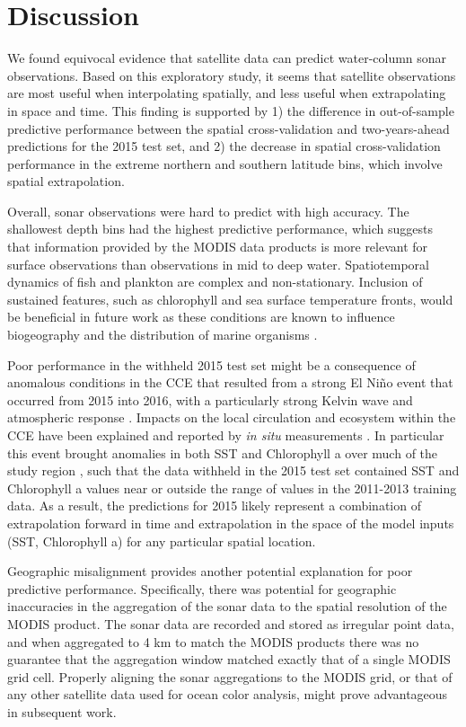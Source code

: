 \documentclass[10pt,letterpaper]{article}
\begin{document}
\section*{Discussion}

We found equivocal evidence that satellite data can predict water-column sonar observations.
Based on this exploratory study, it seems that satellite observations are most useful when interpolating spatially, and less useful when extrapolating in space and time.
This finding is supported by 1) the difference in out-of-sample predictive performance between the spatial cross-validation and two-years-ahead predictions for the 2015 test set, and 2) the decrease in spatial cross-validation performance in the extreme northern and southern latitude bins, which involve spatial extrapolation.

Overall, sonar observations were hard to predict with high accuracy.
The shallowest depth bins had the highest predictive performance, which suggests that information provided by the MODIS data products is more relevant for surface observations than observations in mid to deep water.
Spatiotemporal dynamics of fish and plankton are complex and non-stationary.
Inclusion of sustained features, such as chlorophyll and sea surface temperature fronts, would be beneficial in future work as these conditions are known to influence biogeography and the distribution of marine organisms \cite{taylor2012sharp, powell2015covariability}.

Poor performance in the withheld 2015 test set might be a consequence of anomalous conditions in the CCE that resulted from a strong El Ni\~no event that occurred from 2015 into 2016, with a particularly strong Kelvin wave and atmospheric response \cite{chen2017formation, hu2017extreme}.
Impacts on the local circulation and ecosystem within the CCE have been explained \cite{jacox2016impacts} and reported by \emph{in situ} measurements \cite{zaba2020volume}.
In particular this event brought anomalies in both SST and Chlorophyll a over much of the study region \cite{jacox2016impacts}, such that the data withheld in the 2015 test set contained SST and Chlorophyll a values near or outside the range of values in the 2011-2013 training data.
As a result, the predictions for 2015 likely represent a combination of extrapolation forward in time and extrapolation in the space of the model inputs (SST, Chlorophyll a) for any particular spatial location.

Geographic misalignment provides another potential explanation for poor predictive performance.
Specifically, there was potential for geographic inaccuracies in the aggregation of the sonar data to the spatial resolution of the MODIS product.
The sonar data are recorded and stored as irregular point data, and when aggregated to 4 km to match the MODIS products there was no guarantee that the aggregation window matched exactly that of a single MODIS grid cell.
Properly aligning the sonar aggregations to the MODIS grid, or that of any other satellite data used for ocean color analysis, might prove advantageous in subsequent work.
\end{document}
